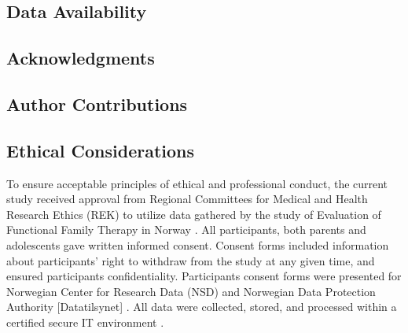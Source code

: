 \subsection{Data Availability}

\subsection{Acknowledgments}

\subsection{Author Contributions}

\subsection{Ethical Considerations}

To ensure acceptable principles of ethical and professional conduct, the current study received approval from Regional Committees for Medical and Health Research Ethics (REK) to utilize data gathered by the study of Evaluation of Functional Family Therapy in Norway \parencite{bjornebekk:2013}. All participants, both parents and adolescents gave written informed consent. Consent forms included information about participants' right to withdraw from the study at any given time, and ensured participants confidentiality. Participants consent forms were presented for Norwegian Center for Research Data (NSD) and Norwegian Data Protection Authority [Datatilsynet] \parencite{bjornebekk:2013}. All data were collected, stored, and processed within a certified secure IT environment \parencite[TSD,][]{tsd:2020}.
